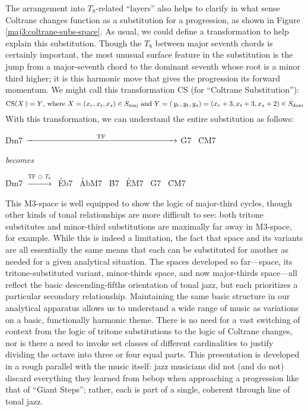 The arrangement into $T_8$-related ``layers'' also helps to clarify in what
sense Coltrane changes function as a substitution for a \tfo progression, as
shown in Figure \ref{maj3:coltrane-subs-space}. As usual, we could define a
transformation to help explain this substitution. Though the $T_8$ between
major seventh chords is certainly important, the most unusual surface feature
in the substitution is the jump from a major-seventh chord to the dominant
seventh whose root is a minor third higher; it is this harmonic move that
gives the progression its forward momentum. We might call this transformation
CS (for ``Coltrane Substitution''):%
%
\begin{displaymath}
    \mathrm{CS}(X\,) = Y\text{, where}\ X = (x_r, x_t, x_s) \in S_{\mathrm{maj}}
    \text{ and}\
    Y = (\,y_r, y_t, y_s) = (x_r + 3, x_t + 3, x_s + 2) \in S_{\mathrm{dom}}
\end{displaymath}%
%
With this transformation, we can understand the entire \tfo substitution
as follows:%
%
\begin{center}
  \h{Dm7}  $\xrightarrow{\hspace{8.25em}\mathrm{TF}\hspace{8.25em}}$ \h{G7} \TFarrow\ \h{CM7}

  \vspace{.5em}
  \emph{becomes}
  \vspace{.5em}

  \h{Dm7}  $\xrightarrow{\mathrm{TF}\ \odot\ T_8\,}$\ \h{Eb7} \TFarrow\
  \h{AbM7} \CSarrow\ \h{B7} \TFarrow\
  \h{EM7}  \CSarrow\ \h{G7} \TFarrow\
  \h{CM7}
\end{center}

This M3-space is well equipped to show the logic of major-third cycles, though
other kinds of tonal relationships are more difficult to see: both tritone
substitutes and minor-third substitutions are maximally far away in M3-space,
for example. While this is indeed a limitation, the fact that \tf space and
its variants are all essentially the same means that each can be substituted
for another as needed for a given analytical situation. The spaces developed
so far---\tf space, its tritone-substituted variant, minor-thirds space, and
now major-thirds space---all reflect the basic descending-fifths orientation
of tonal jazz, but each prioritizes a particular secondary
relationship.\fn{maj3-16} Maintaining the same basic structure in our
analytical apparatus allows us to understand a wide range of music as
variations on a basic, functionally harmonic theme. There is no need for a
vast switching of context from the logic of tritone substitutions to the logic
of Coltrane changes, nor is there a need to invoke set classes of different
cardinalities to justify dividing the octave into three or four equal parts.
This presentation is developed in a rough parallel with the music itself: jazz
musicians did not (and do not) discard everything they learned from bebop when
approaching a progression like that of ``Giant Steps''; rather, each is part
of a single, coherent through line of tonal jazz.

